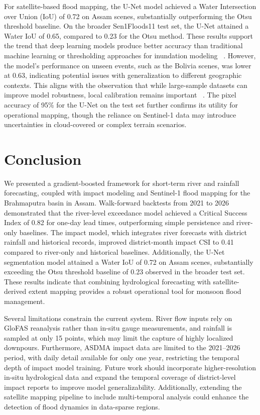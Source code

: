 \documentclass[conference]{IEEEtran}
\begin{document}
For satellite-based flood mapping, the U-Net model achieved a Water Intersection over Union (IoU) of 0.72 on Assam scenes, substantially outperforming the Otsu threshold baseline. On the broader Sen1Floods11 test set, the U-Net attained a Water IoU of 0.65, compared to 0.23 for the Otsu method. These results support the trend that deep learning models produce better accuracy than traditional machine learning or thresholding approaches for inundation modeling ~\cite{karim2023c3}. However, the model's performance on unseen events, such as the Bolivia scenes, was lower at 0.63, indicating potential issues with generalization to different geographic contexts. This aligns with the observation that while large-sample datasets can improve model robustness, local calibration remains important ~\cite{kratzert2019c16}. The pixel accuracy of 95\% for the U-Net on the test set further confirms its utility for operational mapping, though the reliance on Sentinel-1 data may introduce uncertainties in cloud-covered or complex terrain scenarios.

\section{Conclusion}
We presented a gradient-boosted framework for short-term river and rainfall forecasting, coupled with impact modeling and Sentinel-1 flood mapping for the Brahmaputra basin in Assam. Walk-forward backtests from 2021 to 2026 demonstrated that the river-level exceedance model achieved a Critical Success Index of 0.82 for one-day lead times, outperforming simple persistence and river-only baselines. The impact model, which integrates river forecasts with district rainfall and historical records, improved district-month impact CSI to 0.41 compared to river-only and historical baselines. Additionally, the U-Net segmentation model attained a Water IoU of 0.72 on Assam scenes, substantially exceeding the Otsu threshold baseline of 0.23 observed in the broader test set. These results indicate that combining hydrological forecasting with satellite-derived extent mapping provides a robust operational tool for monsoon flood management.

Several limitations constrain the current system. River flow inputs rely on GloFAS reanalysis rather than in-situ gauge measurements, and rainfall is sampled at only 15 points, which may limit the capture of highly localized downpours. Furthermore, ASDMA impact data are limited to the 2021–2026 period, with daily detail available for only one year, restricting the temporal depth of impact model training. Future work should incorporate higher-resolution in-situ hydrological data and expand the temporal coverage of district-level impact reports to improve model generalizability. Additionally, extending the satellite mapping pipeline to include multi-temporal analysis could enhance the detection of flood dynamics in data-sparse regions.



\end{document}
